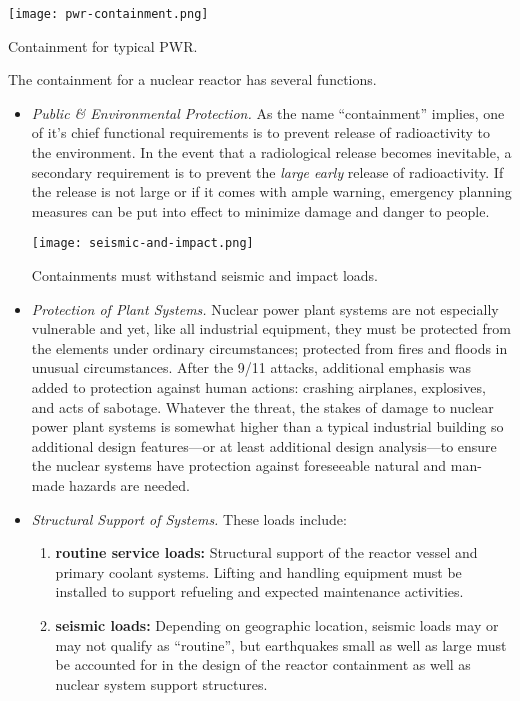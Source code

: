 \begin{marginfigure}
\texttt{[image: pwr-containment.png]}
\caption{Containment for typical PWR.}
\label{fig:pwr-containment}
\end{marginfigure}
The containment for a nuclear reactor has several functions.
\begin{itemize}
\item \emph{Public \& Environmental Protection.} As the name ``containment'' implies, one of it's chief functional requirements is to prevent release of radioactivity to the environment.  In the event that a radiological release becomes inevitable, a secondary requirement is to prevent the \emph{large early} release of radioactivity.  If the release is not large or if it comes with ample warning, emergency planning measures can be put into effect to minimize damage and danger to people.

\begin{marginfigure}
\texttt{[image: seismic-and-impact.png]}
\caption{Containments must withstand seismic and impact loads.}
\label{fig:seismic-and-impact}
\end{marginfigure}
\item \emph{Protection of Plant Systems.}  Nuclear power plant systems are not especially vulnerable and yet, like all industrial equipment, they must be protected from the elements under ordinary circumstances; protected from fires and floods in unusual circumstances.  After the 9/11 attacks, additional emphasis was added to protection against human actions: crashing airplanes, explosives, and acts of sabotage.  Whatever the threat, the stakes of damage to nuclear power plant systems is somewhat higher than a typical industrial building so additional design features---or at least additional design analysis---to ensure the nuclear systems have protection against foreseeable natural and man-made hazards are needed.

\item \emph{Structural Support of Systems.}  These loads include:
\begin{enumerate}
\item \textbf{routine service loads:}  Structural support of the reactor vessel and primary coolant systems.  Lifting and handling equipment must be installed to support refueling and expected maintenance activities.  
\item \textbf{seismic loads:} Depending on geographic location, seismic loads may or may not qualify as ``routine'', but earthquakes small as well as large must be accounted for in the design of the reactor containment as well as nuclear system support structures.


\end{enumerate}
\end{itemize}
